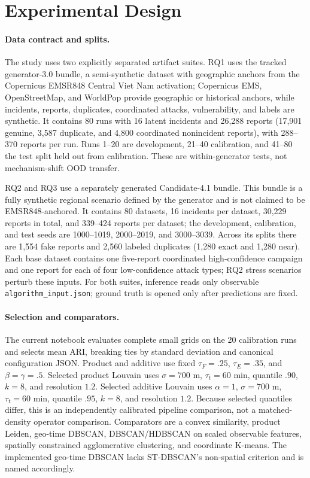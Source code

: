 \documentclass[runningheads]{llncs}
\begin{document}
\FloatBarrier

\section{Experimental Design}

\paragraph{Data contract and splits.}
The study uses two explicitly separated artifact suites. RQ1 uses the tracked
generator-3.0 bundle, a semi-synthetic dataset with geographic anchors from
the Copernicus EMSR848 Central Viet Nam activation; Copernicus EMS,
OpenStreetMap, and WorldPop provide geographic or historical anchors, while
incidents, reports, duplicates, coordinated attacks, vulnerability, and
labels are synthetic. It contains 80 runs with 16 latent incidents and
26,288 reports (17,901 genuine, 3,587 duplicate, and 4,800 coordinated
nonincident reports), with 288--370 reports per run. Runs 1--20 are
development, 21--40 calibration, and 41--80 the test split held out from
calibration. These are within-generator tests, not mechanism-shift OOD
transfer.

RQ2 and RQ3 use a separately generated Candidate-4.1 bundle. This bundle is
a fully synthetic regional scenario defined by the generator and is not
claimed to be EMSR848-anchored. It contains 80 datasets, 16 incidents per
dataset, 30,229 reports in total, and 339--424 reports per dataset; the
development, calibration, and test seeds are 1000--1019, 2000--2019, and
3000--3039. Across its splits there are 1,554 fake reports and 2,560 labeled
duplicates (1,280 exact and 1,280 near). Each base dataset contains one
five-report coordinated high-confidence campaign and one report for each of
four low-confidence attack types; RQ2 stress scenarios perturb these inputs.
For both suites, inference reads only observable
\texttt{algorithm\_input.json}; ground truth is opened only after predictions
are fixed.

\paragraph{Selection and comparators.}
The current notebook evaluates complete small grids on the 20 calibration
runs and selects mean ARI, breaking ties by standard deviation and canonical
configuration JSON. Product and additive use fixed $\tau_F=.25$,
$\tau_E=.35$, and $\beta=\gamma=.5$. Selected product Louvain uses
$\sigma=700$ m, $\tau_t=60$ min, quantile $.90$, $k=8$, and resolution $1.2$.
Selected additive Louvain uses $\alpha=1$, $\sigma=700$ m, $\tau_t=60$ min,
quantile $.95$, $k=8$, and resolution $1.2$. Because selected quantiles
differ, this is an independently calibrated pipeline comparison, not a
matched-density operator comparison. Comparators are a convex similarity,
product Leiden, geo-time DBSCAN, DBSCAN/HDBSCAN on scaled observable features,
spatially constrained agglomerative clustering, and coordinate K-means. The
implemented geo-time DBSCAN lacks ST-DBSCAN's non-spatial criterion and is
named accordingly.
\end{document}
